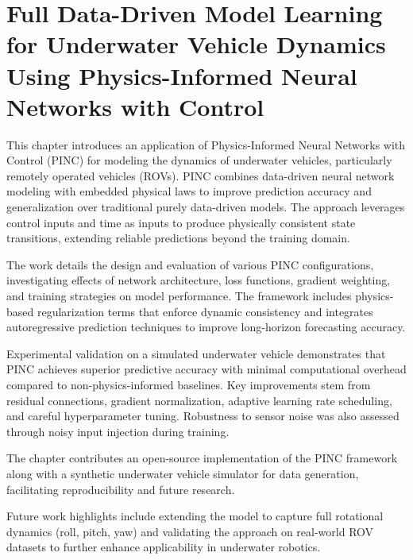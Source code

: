 \chapter{Full Data-Driven Model Learning for Underwater Vehicle Dynamics Using Physics-Informed Neural Networks with Control}

This chapter introduces an application of Physics-Informed Neural Networks with Control (PINC) for modeling the dynamics of underwater vehicles, particularly remotely operated vehicles (ROVs). PINC combines data-driven neural network modeling with embedded physical laws to improve prediction accuracy and generalization over traditional purely data-driven models. The approach leverages control inputs and time as inputs to produce physically consistent state transitions, extending reliable predictions beyond the training domain.

The work details the design and evaluation of various PINC configurations, investigating effects of network architecture, loss functions, gradient weighting, and training strategies on model performance. The framework includes physics-based regularization terms that enforce dynamic consistency and integrates autoregressive prediction techniques to improve long-horizon forecasting accuracy.

Experimental validation on a simulated underwater vehicle demonstrates that PINC achieves superior predictive accuracy with minimal computational overhead compared to non-physics-informed baselines. Key improvements stem from residual connections, gradient normalization, adaptive learning rate scheduling, and careful hyperparameter tuning. Robustness to sensor noise was also assessed through noisy input injection during training.

The chapter contributes an open-source implementation of the PINC framework along with a synthetic underwater vehicle simulator for data generation, facilitating reproducibility and future research.

Future work highlights include extending the model to capture full rotational dynamics (roll, pitch, yaw) and validating the approach on real-world ROV datasets to further enhance applicability in underwater robotics.